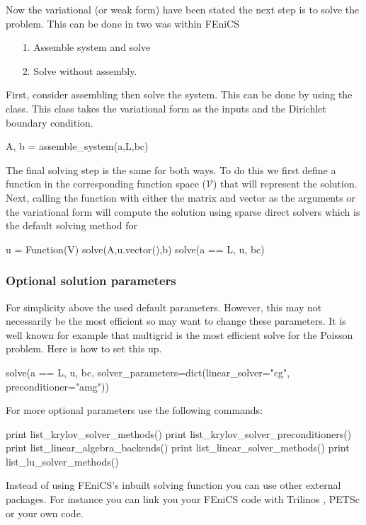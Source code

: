 Now the variational  (or weak form) have been stated the next step is to solve the problem. This can be done in two was within FEniCS
\begin{itemize}
    \item[1.] Assemble system and solve
    \item[2.] Solve without assembly.
\end{itemize}
First, consider assembling then solve the system. This can be done by using the {} class. This class takes the variational form as the inputs and the Dirichlet boundary condition.
\begin{pythoncode}
A, b = assemble_system(a,L,bc)
\end{pythoncode}
The final solving step is the same for both ways. To do this we first define a function {} in the corresponding function space ($\mathcal{V}$) that will represent the solution. Next, calling the  function with either the matrix  and vector  as the arguments or the variational form will compute the solution using sparse direct solvers which is the  default solving method for \fenics
\begin{pythoncode}
u = Function(V)
solve(A,u.vector(),b)
solve(a == L, u, bc)
\end{pythoncode}

\subsubsection{Optional solution parameters}

For simplicity above the  used \fenics default parameters. However, this may not necessarily be the most efficient so may want to change these parameters. It is well known for example that multigrid is the most efficient solve for the Poisson problem. Here is how to set this up.
\begin{pythoncode}
solve(a == L, u, bc,
            solver_parameters=dict(linear_solver="cg",
            preconditioner="amg"))
\end{pythoncode}
For more optional parameters use the following commands:
\begin{pythoncode}
print list_krylov_solver_methods()
print list_krylov_solver_preconditioners()
print list_linear_algebra_backends()
print list_linear_solver_methods()
print list_lu_solver_methods()
\end{pythoncode}

Instead of using FEniCS's inbuilt solving function you can use other external packages. For instance you can link you your FEniCS code with Trilinos \cite{Trilinos-Users-Guide,Trilinos-Overview}, PETSc \cite{petsc-web-page,petsc-user-ref} or your own code.

